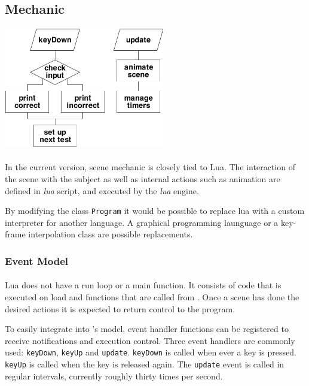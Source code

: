 \subsection{Mechanic\label{Mechanic}}

\begin{center}
\includegraphics[width=7cm]{media/code.pdf}
\end{center}

\paragraph{}
In the current version, scene mechanic is closely tied to Lua.
The interaction of the scene with the subject as well as internal actions such as animation are defined in \textit{lua} script, and executed by the \textit{lua} engine.

By modifying the class \lstinline{Program} it would be possible to replace lua with a custom interpreter for another language.
A graphical programming launguage or a key-frame interpolation class are possible replacements.

\subsubsection{Event Model}
\paragraph{}
Lua does not have a run loop or a main function.
It consists of code that is executed on load and functions that are called from \ER.
Once a scene has done the desired actions it is expected to return control to the program.

To easily integrate into \ER's model, event handler functions can be registered to receive notifications and execution control.
Three event handlers are commonly used: \lstinline{keyDown}, \lstinline{keyUp} and \lstinline{update}.
\lstinline{keyDown} is called when ever a key is pressed.
\lstinline{keyUp} is called when the key is released again.
The \lstinline{update} event is called in regular intervals, currently roughly thirty times per second.

